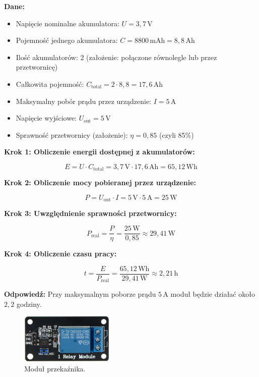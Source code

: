 \documentclass[magisterska]{pracadypl}
\begin{document}
\textbf{Dane:}
\begin{itemize}
  \item Napięcie nominalne akumulatora: $U = 3{,}7\,\mathrm{V}$
  \item Pojemność jednego akumulatora: $C = 8800\,\mathrm{mAh} = 8{,}8\,\mathrm{Ah}$
  \item Ilość akumulatorów: 2 (założenie: połączone równolegle lub przez przetwornicę)
  \item Całkowita pojemność: $C_{\text{total}} = 2 \cdot 8{,}8 = 17{,}6\,\mathrm{Ah}$
  \item Maksymalny pobór prądu przez urządzenie: $I = 5\,\mathrm{A}$
  \item Napięcie wyjściowe: $U_{\text{out}} = 5\,\mathrm{V}$
  \item Sprawność przetwornicy (założenie): $\eta = 0{,}85$ (czyli 85\%)
\end{itemize}

\textbf{Krok 1: Obliczenie energii dostępnej z akumulatorów:}

\[
E = U \cdot C_{\text{total}} = 3{,}7\,\mathrm{V} \cdot 17{,}6\,\mathrm{Ah} = 65{,}12\,\mathrm{Wh}
\]

\textbf{Krok 2: Obliczenie mocy pobieranej przez urządzenie:}

\[
P = U_{\text{out}} \cdot I = 5\,\mathrm{V} \cdot 5\,\mathrm{A} = 25\,\mathrm{W}
\]

\textbf{Krok 3: Uwzględnienie sprawności przetwornicy:}

\[
P_{\text{real}} = \frac{P}{\eta} = \frac{25\,\mathrm{W}}{0{,}85} \approx 29{,}41\,\mathrm{W}
\]

\textbf{Krok 4: Obliczenie czasu pracy:}

\[
t = \frac{E}{P_{\text{real}}} = \frac{65{,}12\,\mathrm{Wh}}{29{,}41\,\mathrm{W}} \approx 2{,}21\,\mathrm{h}
\]

\textbf{Odpowiedź:} Przy maksymalnym poborze prądu $5\,\mathrm{A}$ moduł będzie działać około $2{,}2$ godziny.

\begin{figure}[H]  %
    \centering  %
    \includegraphics[width=0.4\textwidth]{images/relay.png}  %
    \captionsetup{font=footnotesize}
    \caption[Moduł przekaźnika. https://botland.com.pl/przekazniki-przekazniki-arduino/1997-modul-przekaznika-1-kanal-z-optoizolacja-styki-10a-250vac-cewka-5v-5904422359096.html]{Moduł przekaźnika.}
\end{figure}
\end{document}
